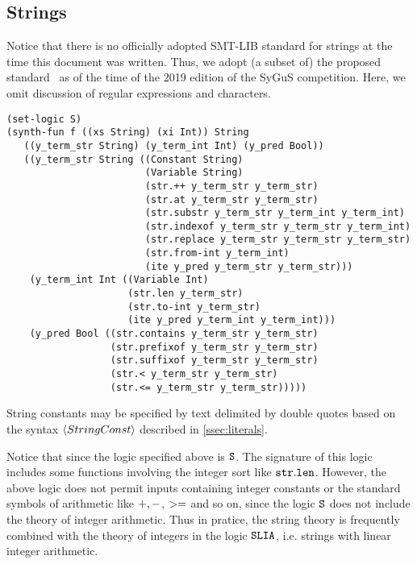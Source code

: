 \documentclass[english,a4paper,10pt]{article}
\begin{document}
\begin{appendix}
\subsection{Strings}

Notice that there is no
officially adopted SMT-LIB standard for strings at the time
this document was written.
Thus, we adopt (a subset of) the proposed standard~\cite{smtlibStrings}
as of the time of the 2019 edition of the SyGuS competition.
Here, we omit discussion of regular expressions and characters.
\begin{lstlisting}[basicstyle={\ttfamily}]
(set-logic S)
(synth-fun f ((xs String) (xi Int)) String
   ((y_term_str String) (y_term_int Int) (y_pred Bool))
   ((y_term_str String ((Constant String)
                        (Variable String)
                        (str.++ y_term_str y_term_str)
                        (str.at y_term_str y_term_str)
                        (str.substr y_term_str y_term_int y_term_int)
                        (str.indexof y_term_str y_term_str y_term_int)
                        (str.replace y_term_str y_term_str y_term_str)
                        (str.from-int y_term_int)
                        (ite y_pred y_term_str y_term_str)))
    (y_term_int Int ((Variable Int)
                     (str.len y_term_str)
                     (str.to-int y_term_str)
                     (ite y_pred y_term_int y_term_int)))
    (y_pred Bool ((str.contains y_term_str y_term_str)
                  (str.prefixof y_term_str y_term_str)
                  (str.suffixof y_term_str y_term_str)
                  (str.< y_term_str y_term_str)
                  (str.<= y_term_str y_term_str)))))
\end{lstlisting}
String constants may be specified by text delimited by double quotes
based on the syntax $\left\langle StringConst\right\rangle$ described in \cref{ssec:literals}.

Notice that since the logic specified above is ${\tt S}$.
The signature of this logic includes 
some functions involving the integer sort like
${\tt str.len}$.
However, the above logic does not permit inputs containing
integer constants or the standard symbols of arithmetic like 
${\tt +}, {\tt -}$, ${\tt >=}$ and so on, since the logic ${\tt S}$
does not include the theory of integer arithmetic.
Thus in pratice, 
the string theory is frequently combined with the theory of integers
in the logic ${\tt SLIA}$, i.e. strings with linear integer arithmetic.





\end{appendix}
\end{document}
